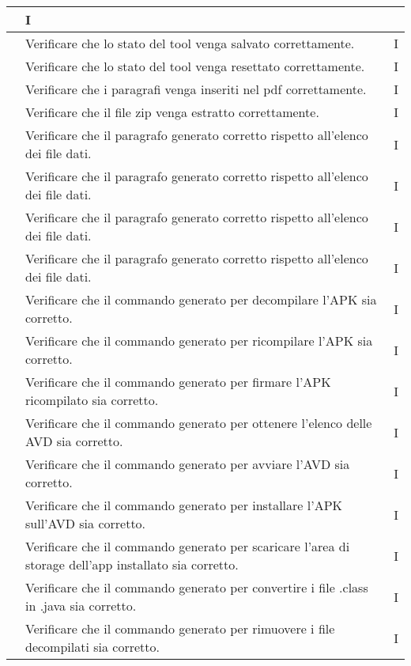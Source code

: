 \begin{longtable}{ |C{3cm} | C{8.5cm}| C{1.5cm} |}
    & I \\\hline
     & Verificare che lo stato del tool venga salvato correttamente.
    & I \\\hline
     & Verificare che lo stato del tool venga resettato correttamente.
    & I \\\hline
     & Verificare che i paragrafi venga inseriti nel pdf correttamente.
    & I \\\hline
     & Verificare che il file zip venga estratto correttamente.
    & I \\\hline
     & Verificare che il paragrafo generato corretto rispetto all'elenco dei file dati.
    & I \\\hline
     & Verificare che il paragrafo generato corretto rispetto all'elenco dei file dati.
    & I \\\hline
     & Verificare che il paragrafo generato corretto rispetto all'elenco dei file dati.
    & I \\\hline
     & Verificare che il paragrafo generato corretto rispetto all'elenco dei file dati.
    & I \\\hline
     & Verificare che il commando generato per decompilare l'APK sia corretto.
    & I \\\hline
     & Verificare che il commando generato per ricompilare l'APK sia corretto.
    & I \\\hline
     & Verificare che il commando generato per firmare l'APK ricompilato sia corretto.
    & I \\\hline
     & Verificare che il commando generato per ottenere l'elenco delle AVD sia corretto.
    & I \\\hline
     & Verificare che il commando generato per avviare l'AVD sia corretto.
    & I \\\hline
     & Verificare che il commando generato per installare l'APK sull'AVD sia corretto.
    & I \\\hline
     & Verificare che il commando generato per scaricare l'area di storage dell'app installato sia corretto.
    & I \\\hline
     & Verificare che il commando generato per convertire i file .class in .java sia corretto.
    & I \\\hline
     & Verificare che il commando generato per rimuovere i file decompilati sia corretto.
    & I \\\hline

\end{longtable}
